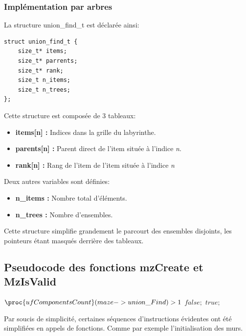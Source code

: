\documentclass[10pt]{article}
\begin{document}
\subsubsection{Implémentation par arbres}

La structure union\_find\_t est déclarée ainsi:
\begin{lstlisting}[style=CStyle]
struct union_find_t {
    size_t* items;
    size_t* parrents;
    size_t* rank;
    size_t n_items;
    size_t n_trees;
};
\end{lstlisting}
Cette structure est composée de 3 tableaux:
\begin{itemize}
\item \textbf{items[n] :} Indices dans la grille du labyrinthe.
\item \textbf{parents[n] :} Parent direct de l'item située à l'indice \emph{n}.
\item \textbf{rank[n] :} Rang de l'item de l'item située à l'indice \emph{n}
\end{itemize}
Deux autres variables sont définies:
\begin{itemize}
\item \textbf{n\_items :} Nombre total d'éléments.
\item \textbf{n\_trees :} Nombre d'ensembles.
\end{itemize}
 
 Cette structure simplifie grandement le parcourt des ensembles disjoints, les pointeurs étant masqués derrière des tableaux.
 

\subsection{Pseudocode des fonctions mzCreate et MzIsValid}

\begin{codebox}
\li    \If $\proc{ufComponentsCount}(maze->union\_Find) > 1$
\li    \Then \Return $false;$
\li    \Else 
\li 		\Return $true;$
\end{codebox}

Par soucis de simplicité, certaines séquences d'instructions évidentes ont été simplifiées en appels de fonctions. Comme par exemple l'initialisation des murs.
\end{document}
